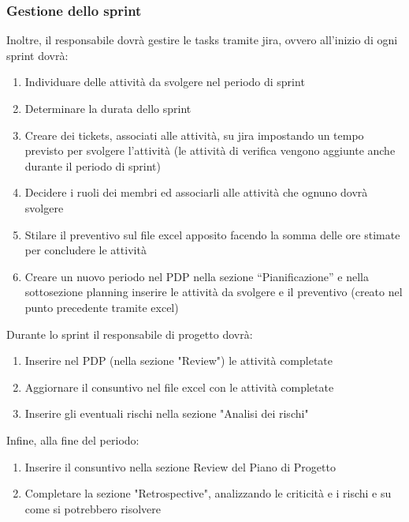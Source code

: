 \subsubsection{Gestione dello sprint}
Inoltre, il responsabile dovrà gestire le tasks tramite jira, ovvero all'inizio di ogni sprint dovrà:
\begin{enumerate}
    \item Individuare delle attività da svolgere nel periodo di sprint
    \item Determinare la durata dello sprint
    \item Creare dei tickets, associati alle attività, su jira impostando un tempo previsto per svolgere l'attività (le attività di verifica vengono aggiunte anche durante il periodo di sprint)
    \item Decidere i ruoli dei membri ed associarli alle attività che ognuno dovrà svolgere
    \item Stilare il preventivo sul file excel apposito facendo la somma delle ore stimate per concludere le attività
    \item Creare un nuovo periodo nel PDP nella sezione “Pianificazione” e nella sottosezione planning inserire le attività da svolgere e il preventivo (creato nel punto precedente tramite excel)
\end{enumerate}
Durante lo sprint il responsabile di progetto dovrà:
\begin{enumerate}
    \item Inserire nel PDP (nella sezione "Review") le attività completate
    \item Aggiornare il consuntivo nel file excel con le attività completate
    \item Inserire gli eventuali rischi nella sezione "Analisi dei rischi"
\end{enumerate}
Infine, alla fine del periodo:
\begin{enumerate}
    \item Inserire il consuntivo nella sezione Review del Piano di Progetto
    \item Completare la sezione "Retrospective", analizzando le criticità e i rischi e su come si potrebbero risolvere
\end{enumerate}
